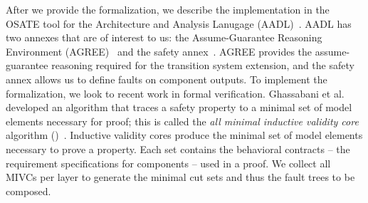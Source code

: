 After we provide the formalization, we describe the implementation in the OSATE tool for the Architecture and Analysis Lanugage (AADL)~\cite{FeilerModelBasedEngineering2012}. AADL has two annexes that are of interest to us: the Assume-Guarantee Reasoning Environment (AGREE)~\cite{NFM2012:CoGaMiWhLaLu} and the safety annex~\cite{stewart2020safety}. AGREE provides the assume-guarantee reasoning required for the transition system extension, and the safety annex allows us to define faults on component outputs. To implement the formalization, we look to recent work in formal verification. Ghassabani et al. developed an algorithm that traces a safety property to a minimal set of model elements necessary for proof; this is called the \textit{all minimal inductive validity core} algorithm (\aivcalg)~\cite{GhassabaniGW16,Ghassabani2017EfficientGO}. Inductive validity cores produce the minimal set of model elements necessary to prove a property. Each set contains the behavioral contracts -- the requirement specifications for components -- used in a proof. We collect all MIVCs per layer to generate the minimal cut sets and thus the fault trees to be composed.





